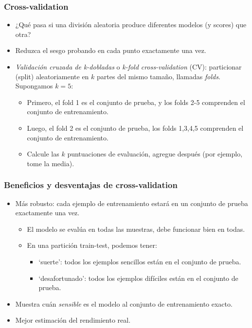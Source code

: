 \documentclass[a4paper, 11pt]{article}
\begin{document}
\subsubsection{Cross-validation}
\begin{itemize}
    \item ¿Qué pasa si una división aleatoria produce diferentes modelos (y scores) que otra?
    \item Reduzca el sesgo probando en cada punto exactamente una vez.
    \item \textit{Validación cruzada de k-dobladas} o \textit{k-fold cross-validation} (CV): particionar (split) aleatoriamente en $k$ partes del mismo tamaño, llamadas \textit{folds}. Supongamos $k=5$:
    \begin{itemize}
        \item Primero, el fold 1 es el conjunto de prueba, y los folds 2-5 comprenden el conjunto de entrenamiento.
        \item Luego, el fold 2 es el conjunto de prueba, los folds 1,3,4,5 comprenden el conjunto de entrenamiento.
        \item Calcule las $k$ puntuaciones de evaluación, agregue después (por ejemplo, tome la media).
    \end{itemize}
\end{itemize}

\subsubsection{Beneficios y desventajas de cross-validation}
\begin{itemize}
    \item Más robusto: cada ejemplo de entrenamiento estará en un conjunto de prueba exactamente una vez.
    \begin{itemize}
        \item El modelo se evalúa en todas las muestras, debe funcionar bien en todas.
        \item En una partición train-test, podemos tener:
        \begin{itemize}
            \item `suerte': todos los ejemplos sencillos están en el conjunto de prueba.
            \item `desafortunado': todos los ejemplos difíciles están en el conjunto de prueba.
        \end{itemize}
    \end{itemize}
    \item Muestra cuán \textit{sensible} es el modelo al conjunto de entrenamiento exacto.
    \item Mejor estimación del rendimiento real.
\end{itemize}
\end{document}
